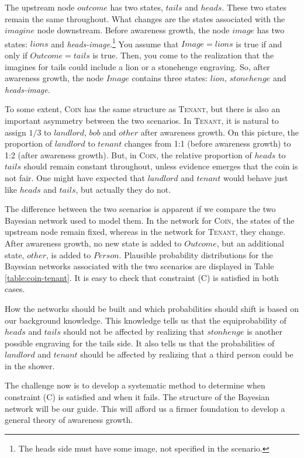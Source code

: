 \documentclass[
  11pt,
  dvipsnames,enabledeprecatedfontcommands]{scrartcl}
\begin{document}
\noindent The upstream node \(outcome\) has two states, \(tails\) and
\(heads\). These two states remain the same throughout. What changes are
the states associated with the \(imagine\) node downstream. Before
awareness growth, the node \(image\) has two states: \(lions\) and
\textit{heads-image}.\footnote{The heads side must have some image, not
  specified in the scenario.} You assume that \(Image=lions\) is true if
and only if \(Outcome=tails\) is true. Then, you come to the realization
that the imagines for tails could include a lion or a stonehenge
engraving. So, after awareness growth, the node \(Image\) contains three
states: \(lion\), \(stonehenge\) and \textit{heads-image}.

To some extent, \textsc{Coin} has the same structure as \textsc{Tenant},
but there is also an important asymmetry between the two scenarios. In
\textsc{Tenant}, it is natural to assign \(1/3\) to \(landlord\),
\(bob\) and \(other\) after awareness growth. On this picture, the
proportion of \(landlord\) to \(tenant\) changes from 1:1 (before
awareness growth) to 1:2 (after awareness growth). But, in
\textsc{Coin}, the relative proportion of \(heads\) to \(tails\) should
remain constant throughout, unless evidence emerges that the coin is not
fair. One might have expected that \(landlord\) and \(tenant\) would
behave just like \(heads\) and \(tails\), but actually they do not.

The difference between the two scenarios is apparent if we compare the
two Bayesian network used to model them. In the network for
\textsc{Coin}, the states of the upstream node remain fixed, whereas in
the network for \textsc{Tenant}, they change. After awareness growth, no
new state is added to \(Outcome\), but an additional state, \(other\),
is added to \(Person\). Plausible probability distributions for the
Bayesian networks associated with the two scenarios are displayed in
Table \ref{table:coin-tenant}. It is easy to check that constraint (C)
is satisfied in both cases.

How the networks should be built and which probabilities should shift is
based on our background knowledge. This knowledge tells us that the
equiprobability of \(heads\) and \(tails\) should not be affected by
realizing that \(stonhenge\) is another possible engraving for the tails
side. It also tells us that the probabilities of \(landlord\) and
\(tenant\) should be affected by realizing that a third person could be
in the shower.

The challenge now is to develop a systematic method to determine when
constraint (C) is satisfied and when it fails. The structure of the
Bayesian network will be our guide. This will afford us a firmer
foundation to develop a general theory of awareness growth.
\end{document}

